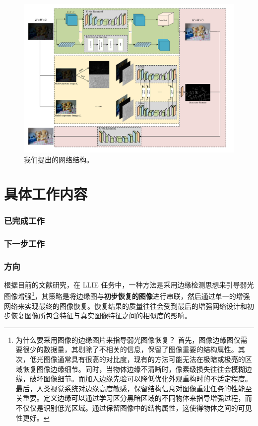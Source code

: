 \documentclass[a4paper]{ctexart}
\begin{document}
	\begin{figure}[htbp]
		\centering 
		\includegraphics[width=\columnwidth]{picture/LLIE/My Architecture/Total architecture}
		\caption{
			\label{fig: Total Architecture} 
			我们提出的网络结构。
		}
	\end{figure}
	

	
	
	
	\part*{具体工作内容}
	
	\section{已完成工作}
	
	\section{下一步工作}
	
	
	\section{方向}
	
	根据目前的文献研究，在 LLIE 任务中，一种方法是采用边缘检测思想来引导弱光图像增强\footnote{为什么要采用图像的边缘图片来指导弱光图像恢复？
		首先，图像边缘图仅需要很少的数据量，其剔除了不相关的信息，保留了图像重要的结构属性。其次，低光图像通常具有很高的对比度，现有的方法可能无法在极暗或极亮的区域恢复图像边缘细节。同时，当物体边缘不清晰时，像素级损失往往会模糊边缘，破坏图像细节。而加入边缘先验可以降低优化外观重构时的不适定程度。最后，人类视觉系统对边缘高度敏感，保留结构信息对图像重建任务的性能至关重要。定义边缘可以通过学习区分黑暗区域的不同物体来指导增强过程，而不仅仅是识别低光区域。通过保留图像中的结构属性，这使得物体之间的可见性更好。}，其策略是将边缘图与\textbf{初步恢复的图像}进行串联，然后通过单一的增强网络来实现最终的图像恢复。恢复结果的质量往往会受到最后的增强网络设计和初步恢复图像所包含特征与真实图像特征之间的相似度的影响。
	
\end{document}
